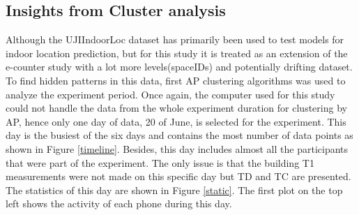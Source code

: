 \subsection{ Insights from Cluster analysis}
Although the UJIIndoorLoc dataset has primarily been used to test models for indoor location prediction, but for this study it is treated as an extension of the e-counter study with a lot more levels(spaceIDs) and potentially drifting dataset. To find hidden patterns in this data, first AP clustering algorithms was used to analyze the experiment period. Once again, the computer used for this study could not handle the data from the whole experiment duration for clustering by AP, hence only one day of data, 20 of June, is selected for the experiment. This day is the busiest of the six days and contains the most number of data points as shown in Figure \ref{timeline}. Besides, this day includes almost all the participants that were part of the experiment. The only issue is that the building T1 measurements were not made on this specific day but TD and TC are presented. The statistics of this day are shown in Figure \ref{static}. The first plot on the top left shows the activity of each phone during this day. 



